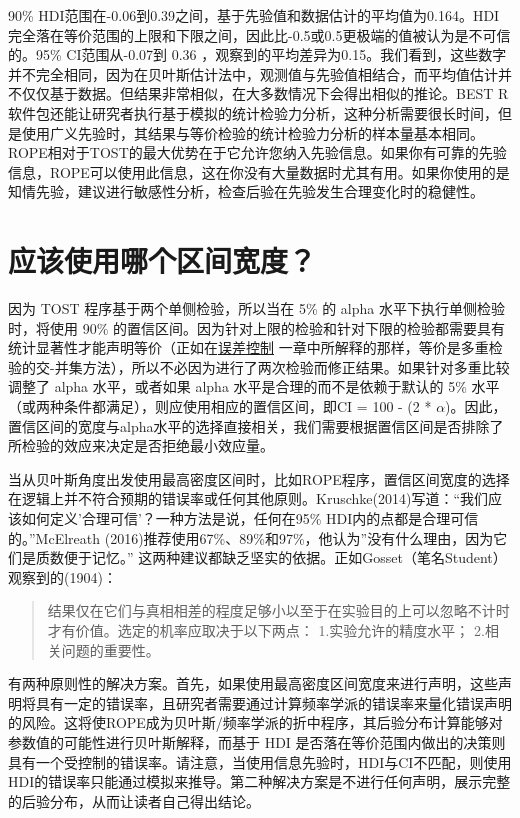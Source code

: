 \documentclass[
  letterpaper,
  DIV=11,
  numbers=noendperiod]{scrreprt}
\begin{document}
90\%
HDI范围在-0.06到0.39之间，基于先验值和数据估计的平均值为0.164。HDI完全落在等价范围的上限和下限之间，因此比-0.5或0.5更极端的值被认为是不可信的。95\%
CI范围从-0.07到 0.36
，观察到的平均差异为0.15。我们看到，这些数字并不完全相同，因为在贝叶斯估计法中，观测值与先验值相结合，而平均值估计并不仅仅基于数据。但结果非常相似，在大多数情况下会得出相似的推论。BEST
R软件包还能让研究者执行基于模拟的统计检验力分析，这种分析需要很长时间，但是使用广义先验时，其结果与等价检验的统计检验力分析的样本量基本相同。ROPE相对于TOST的最大优势在于它允许您纳入先验信息。如果你有可靠的先验信息，ROPE可以使用此信息，这在你没有大量数据时尤其有用。如果你使用的是知情先验，建议进行敏感性分析，检查后验在先验发生合理变化时的稳健性。

\hypertarget{sec-whichinterval}{%
\section{应该使用哪个区间宽度？}\label{sec-whichinterval}}

因为 TOST 程序基于两个单侧检验，所以当在 5\% 的 alpha
水平下执行单侧检验时，将使用 90\%
的置信区间。因为针对上限的检验和针对下限的检验都需要具有统计显著性才能声明等价（正如在\protect\hyperlink{multiplecomparisons}{误差控制}
一章中所解释的那样，等价是多重检验的交-并集方法），所以不必因为进行了两次检验而修正结果。如果针对多重比较调整了
alpha 水平，或者如果 alpha 水平是合理的而不是依赖于默认的 5\%
水平（或两种条件都满足），则应使用相应的置信区间，即CI = 100 - (2 *
\(\alpha\))。因此，置信区间的宽度与alpha水平的选择直接相关，我们需要根据置信区间是否排除了所检验的效应来决定是否拒绝最小效应量。

当从贝叶斯角度出发使用最高密度区间时，比如ROPE程序，置信区间宽度的选择在逻辑上并不符合预期的错误率或任何其他原则。Kruschke(2014)写道：``我们应该如何定义'合理可信'？一种方法是说，任何在95\%
HDI内的点都是合理可信的。''McElreath
(2016)推荐使用67\%、89\%和97\%，他认为''没有什么理由，因为它们是质数便于记忆。''
这两种建议都缺乏坚实的依据。正如Gosset（笔名Student）观察到的(1904)：

\begin{quote}
结果仅在它们与真相相差的程度足够小以至于在实验目的上可以忽略不计时才有价值。选定的机率应取决于以下两点：
1.实验允许的精度水平； 2.相关问题的重要性。
\end{quote}

有两种原则性的解决方案。首先，如果使用最高密度区间宽度来进行声明，这些声明将具有一定的错误率，且研究者需要通过计算频率学派的错误率来量化错误声明的风险。这将使ROPE成为贝叶斯/频率学派的折中程序，其后验分布计算能够对参数值的可能性进行贝叶斯解释，而基于
HDI
是否落在等价范围内做出的决策则具有一个受控制的错误率。请注意，当使用信息先验时，HDI与CI不匹配，则使用HDI的错误率只能通过模拟来推导。第二种解决方案是不进行任何声明，展示完整的后验分布，从而让读者自己得出结论。
\end{document}
